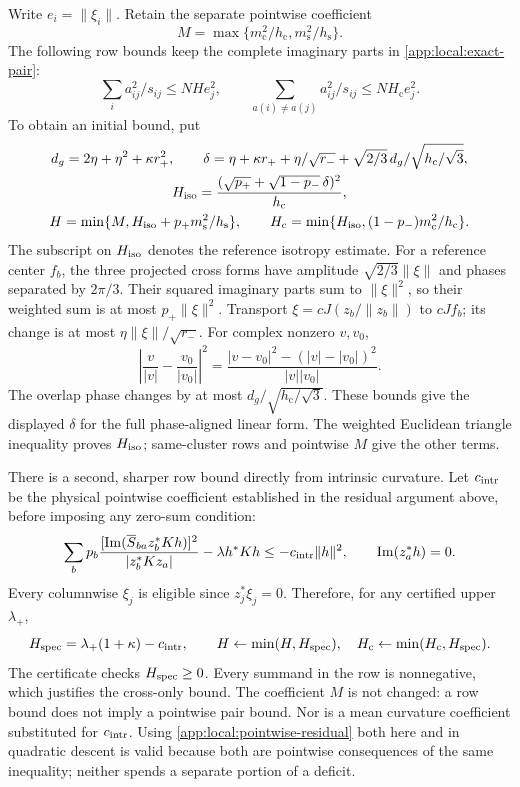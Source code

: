 Write $e_i=\|\xi_i\|$. Retain the separate pointwise coefficient
\[
 M=\max\{m_{\mathrm c}^2/h_{\mathrm c},m_{\mathrm s}^2/h_{\mathrm s}\}.
\]
The following row bounds keep the complete imaginary parts in
\eqref{app:local:exact-pair}:
\[
 \sum_i a_{ij}^2/s_{ij}\le NH e_j^2,\qquad
 \sum_{a(i)\ne a(j)}a_{ij}^2/s_{ij}\le NH_{\mathrm c}e_j^2.
\]
To obtain an initial bound, put
\begin{gather}
 d_g=2\eta+\eta^2+\kappa r_+^2,\qquad
 \delta=\eta+\kappa r_++\eta/\sqrt{r_-}
       +\sqrt{2/3}\,d_g/\sqrt{h_{\mathrm c}/\sqrt3},\nonumber\\
 H_{\rm iso}=\frac{(\sqrt{p_+}+\sqrt{1-p_-}\,\delta)^2}{h_{\mathrm c}},
 \label{app:local:row-initial}\\
 H=\min\{M,H_{\rm iso}+p_+m_{\mathrm s}^2/h_{\mathrm s}\},\qquad
 H_{\mathrm c}=\min\{H_{\rm iso},(1-p_-)m_{\mathrm c}^2/h_{\mathrm c}\}.
 \nonumber
\end{gather}
The subscript on $H_{\rm iso}$ denotes the reference isotropy estimate.
For a reference center $f_b$, the three projected cross forms have
amplitude $\sqrt{2/3}\|\xi\|$ and phases separated by $2\pi/3$.
Their squared imaginary parts sum to $\|\xi\|^2$, so their weighted sum
is at most $p_+\|\xi\|^2$. Transport $\xi=cJ(z_b/\|z_b\|)$ to
$cJf_b$; its change is at most $\eta\|\xi\|/\sqrt{r_-}$.
For complex nonzero $v,v_0$,
\[
 \left|\frac v{|v|}-\frac{v_0}{|v_0|}\right|^2
 =\frac{|v-v_0|^2-(|v|-|v_0|)^2}{|v||v_0|}.
\]
The overlap phase changes by at most $d_g/\sqrt{h_{\mathrm c}/\sqrt3}$.
These bounds give the displayed $\delta$ for the full phase-aligned
linear form. The weighted Euclidean triangle inequality proves
$H_{\rm iso}$; same-cluster rows and pointwise $M$ give the other terms.

There is a second, sharper row bound directly from intrinsic curvature.
Let $c_{\rm intr}$ be the physical pointwise coefficient established in
the residual argument above, before imposing any zero-sum condition:
\begin{equation}\label{app:local:pointwise-residual}
 \sum_b p_b\frac{[\operatorname{Im}(\overline S_{ba}z_b^*Kh)]^2}{|z_b^*Kz_a|}
       -\lambda h^*Kh\le-c_{\rm intr}\|h\|^2,\qquad
 \operatorname{Im}(z_a^*h)=0.
\end{equation}
Every columnwise $\xi_j$ is eligible since $z_j^*\xi_j=0$. Therefore,
for any certified upper $\lambda_+$,
\begin{equation}\label{app:local:spectral-row}
 H_{\rm spec}=\lambda_+(1+\kappa)-c_{\rm intr},\qquad
 H\leftarrow\min(H,H_{\rm spec}),\quad
 H_{\mathrm c}\leftarrow\min(H_{\mathrm c},H_{\rm spec}).
\end{equation}
The certificate checks $H_{\rm spec}\ge0$. Every summand in the row
is nonnegative, which justifies the cross-only bound. The coefficient
$M$ is not changed: a row bound does not imply a pointwise pair bound.
Nor is a mean curvature coefficient substituted for $c_{\rm intr}$.
Using \eqref{app:local:pointwise-residual} both here and in quadratic
descent is valid because both are pointwise consequences of the same
inequality; neither spends a separate portion of a deficit.

